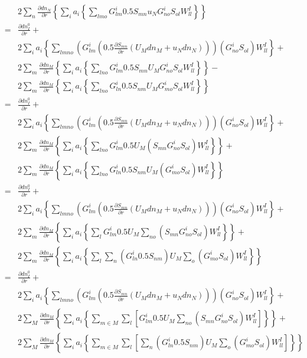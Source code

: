 \documentclass{article}
\begin{document}
\begin{eqnarray*}
&&   2 \sum_{n} \frac{\partial dn_N}{\partial r} \left\{ \sum_i a_i \left\{ \sum_{lmo} G^i_{lm} 0.5 S_{mn} u_N G^i_{no} S_{ol} W^I_{ll} \right\} \right\} \\
   & = & \frac{\partial dn^0_I}{\partial r} + \\
&&   2 \sum_i a_i \left\{ \sum_{lmno} \left(G^i_{lm} \left( 0.5 \frac{\partial S_{mn}}{\partial r} (U_M dn_M + u_N dn_N)\right)\right) \left( G^i_{no} S_{ol} \right) W^I_{ll} \right\} + \\
&&   2 \sum_{m} \frac{\partial dn_M}{\partial r} \left\{ \sum_i a_i \left\{ \sum_{lno} G^i_{lm} 0.5 S_{mn} U_M G^i_{no} S_{ol} W^I_{ll} \right\}\right\} - \\
&&   2 \sum_{m} \frac{\partial dn_M}{\partial r} \left\{ \sum_i a_i \left\{ \sum_{lno} G^i_{ln} 0.5 S_{nm} U_M G^i_{mo} S_{ol} W^I_{ll} \right\} \right\} \\
   & = & \frac{\partial dn^0_I}{\partial r} + \\
&&   2 \sum_i a_i \left\{ \sum_{lmno} \left(G^i_{lm} \left( 0.5 \frac{\partial S_{mn}}{\partial r} (U_M dn_M + u_N dn_N)\right)\right) \left( G^i_{no} S_{ol} \right) W^I_{ll} \right\} + \\
&&   2 \sum_{m} \frac{\partial dn_M}{\partial r} \left\{ \sum_i a_i \left\{ \sum_{lno} G^i_{lm} 0.5 U_M ( S_{mn} G^i_{no} S_{ol} ) W^I_{ll} \right\}\right\} + \\
&&   2 \sum_{m} \frac{\partial dn_M}{\partial r} \left\{ \sum_i a_i \left\{ \sum_{lno} G^i_{ln} 0.5 S_{nm} U_M (G^i_{mo} S_{ol}) W^I_{ll} \right\} \right\} \\
   & = & \frac{\partial dn^0_I}{\partial r} + \\
&&   2 \sum_i a_i \left\{ \sum_{lmno} \left(G^i_{lm} \left( 0.5 \frac{\partial S_{mn}}{\partial r} (U_M dn_M + u_N dn_N)\right)\right) \left( G^i_{no} S_{ol} \right) W^I_{ll} \right\} + \\
&&   2 \sum_{m} \frac{\partial dn_M}{\partial r} \left\{ \sum_i a_i \left\{ \sum_{l} G^i_{lm} 0.5 U_M \sum_{no} ( S_{mn} G^i_{no} S_{ol} ) W^I_{ll} \right\}\right\} + \\
&&   2 \sum_{m} \frac{\partial dn_M}{\partial r} \left\{ \sum_i a_i \left\{ \sum_{l} \sum_n (G^i_{ln} 0.5 S_{nm}) U_M \sum_o (G^i_{mo} S_{ol}) W^I_{ll} \right\} \right\} \\
   & = & \frac{\partial dn^0_I}{\partial r} + \\
&&   2 \sum_i a_i \left\{ \sum_{lmno} \left(G^i_{lm} \left( 0.5 \frac{\partial S_{mn}}{\partial r} (U_M dn_M + u_N dn_N)\right)\right) \left( G^i_{no} S_{ol} \right) W^I_{ll} \right\} + \\
&&   2 \sum_{M} \frac{\partial dn_M}{\partial r} \left\{ \sum_i a_i \left\{ \sum_{m \in M} \sum_{l} \left[ G^i_{lm} 0.5 U_M \sum_{no} ( S_{mn} G^i_{no} S_{ol} ) W^I_{ll} \right] \right\}\right\} + \\
&&   2 \sum_{M} \frac{\partial dn_M}{\partial r} \left\{ \sum_i a_i \left\{ \sum_{m \in M} \sum_{l} \left[ \sum_n (G^i_{ln} 0.5 S_{nm}) U_M \sum_o (G^i_{mo} S_{ol}) W^I_{ll} \right] \right\} \right\} \\
\end{eqnarray*}
\end{document}
